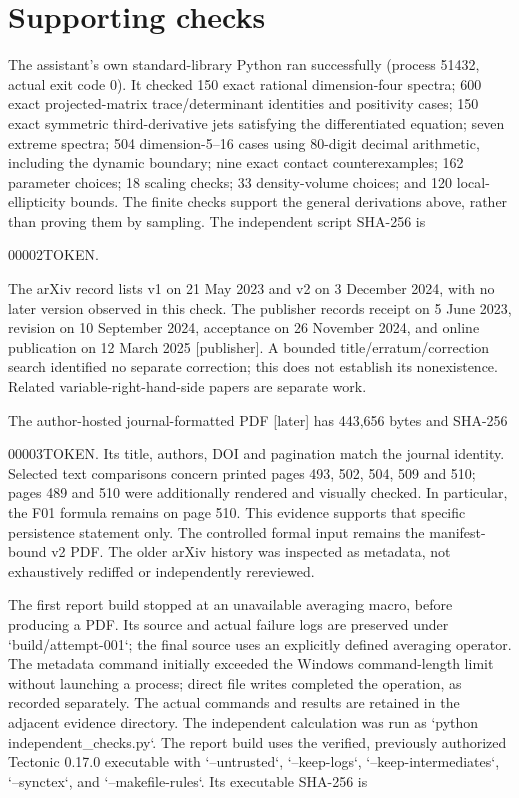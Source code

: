 \documentclass[10pt]{article}
\begin{document}
\section*{Supporting checks}
The assistant’s own standard-library Python ran successfully (process 51432, actual exit code 0). It checked 150 exact rational dimension-four spectra; 600 exact projected-matrix trace/determinant identities and positivity cases; 150 exact symmetric third-derivative jets satisfying the differentiated equation; seven extreme spectra; 504 dimension-5–16 cases using 80-digit decimal arithmetic, including the dynamic boundary; nine exact contact counterexamples; 162 parameter choices; 18 scaling checks; 33 density-volume choices; and 120 local-ellipticity bounds. The finite checks support the general derivations above, rather than proving them by sampling. The independent script SHA-256 is\par
00002TOKEN.\par
The arXiv record lists v1 on 21 May 2023 and v2 on 3 December 2024, with no later version observed in this check. The publisher records receipt on 5 June 2023, revision on 10 September 2024, acceptance on 26 November 2024, and online publication on 12 March 2025 [publisher]. A bounded title/erratum/correction search identified no separate correction; this does not establish its nonexistence. Related variable-right-hand-side papers are separate work.\par
The author-hosted journal-formatted PDF [later] has 443,656 bytes and SHA-256\par
00003TOKEN. Its title, authors, DOI and pagination match the journal identity. Selected text comparisons concern printed pages 493, 502, 504, 509 and 510; pages 489 and 510 were additionally rendered and visually checked. In particular, the F01 formula remains on page 510. This evidence supports that specific persistence statement only. The controlled formal input remains the manifest-bound v2 PDF. The older arXiv history was inspected as metadata, not exhaustively rediffed or independently rereviewed.\par
The first report build stopped at an unavailable averaging macro, before producing a PDF. Its source and actual failure logs are preserved under `build/attempt-001`; the final source uses an explicitly defined averaging operator. The metadata command initially exceeded the Windows command-length limit without launching a process; direct file writes completed the operation, as recorded separately. The actual commands and results are retained in the adjacent evidence directory. The independent calculation was run as `python independent\_checks.py`. The report build uses the verified, previously authorized Tectonic 0.17.0 executable with `–untrusted`, `–keep-logs`, `–keep-intermediates`, `–synctex`, and `–makefile-rules`. Its executable SHA-256 is\par
\end{document}
